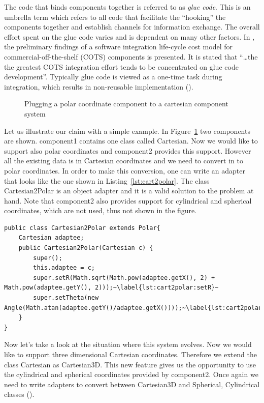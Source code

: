 The code that binds components together is referred to as \emph{glue code}. This is an umbrella term which refers to all code that facilitate the ``hooking'' the components together and establish channels for information exchange. The overall effort spent on the glue code varies and is dependent on many other factors. In \cite{abts2000cocots}, the preliminary findings of a software integration life-cycle cost model for commercial-off-the-shelf (COTS) components is presented. It is stated that ``\ldots the the greatest COTS integration effort tends to be concentrated on glue code development''. Typically glue code is viewed as a one-time task during integration, which results in non-reusable implementation ().

\begin{figure}[h]
\centering
{}
\caption{Plugging a polar coordinate component to a cartesian component system}%
\label{fig:cartesian}%
\end{figure}

Let us illustrate our claim with a simple example. In Figure~\ref{fig:cartesian} two components are shown. \textsf{component1} contains one class called \textsf{Cartesian}. Now we would like to support also polar coordinates and \textsf{component2} provides this support. However all the existing data is in Cartesian coordinates and we need to convert in to polar coordinates. In order to make this conversion, one can write an adapter that looks like the one shown in Listing~\ref{lst:cart2polar}. The class \textsf{Cartesian2Polar} is an object adapter and it is a valid solution to the problem at hand. Note that \textsf{component2} also provides support for cylindrical and spherical coordinates, which are not used, thus not shown in the figure. 

\begin{lstlisting}[float, caption={A Cartesian to polar adapter}, label={lst:cart2polar}]
public class Cartesian2Polar extends Polar{
	Cartesian adaptee;
	public Cartesian2Polar(Cartesian c) {
		super();
		this.adaptee = c;
		super.setR(Math.sqrt(Math.pow(adaptee.getX(), 2) + Math.pow(adaptee.getY(), 2)));~\label{lst:cart2polar:setR}~
		super.setTheta(new Angle(Math.atan(adaptee.getY()/adaptee.getX())));~\label{lst:cart2polar:setTheta}~
	}
}
\end{lstlisting}

Now let's take a look at the situation where this system evolves. Now we would like to support three dimensional Cartesian coordinates. Therefore we extend the class \textsf{Cartesian} as \textsf{Cartesian3D}. This new feature gives us the opportunity to use the cylindrical and spherical coordinates provided by \textsf{component2}. Once again we need to write adapters to convert between \textsf{Cartesian3D} and \textsf{Spherical, Cylindrical} classes (). 

